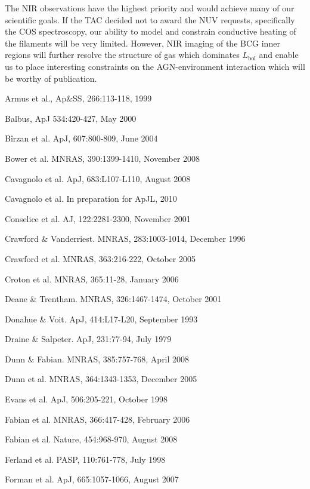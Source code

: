 \documentclass[11pt]{article}
\begin{document}
The NIR observations have the highest priority and would achieve many
of our scientific goals. If the TAC decided not to award the NUV
requests, specifically the COS spectroscopy, our ability to model and
constrain conductive heating of the filaments will be very
limited. However, NIR imaging of the BCG inner regions will further
resolve the structure of gas which dominates $L_{\mathrm{bol}}$ and
enable us to place interesting constraints on the AGN-environment
interaction which will be worthy of publication.


\noindent [1] Armus et al., Ap\&SS, 266:113-118, 1999

\noindent [2] Balbus, ApJ 534:420-427, May 2000

\noindent [3] B\^irzan et al. ApJ, 607:800-809, June 2004

\noindent [4] Bower et al. MNRAS, 390:1399-1410, November 2008

\noindent [5] Cavagnolo et al. ApJ, 683:L107-L110, August 2008

\noindent [6] Cavagnolo et al. In preparation for ApJL, 2010

\noindent [7] Conselice et al. AJ, 122:2281-2300, November 2001

\noindent [8] Crawford \& Vanderriest. MNRAS, 283:1003-1014, December 1996

\noindent [9] Crawford et al. MNRAS, 363:216-222, October 2005

\noindent [10] Croton et al. MNRAS, 365:11-28, January 2006

\noindent [11] Deane \& Trentham. MNRAS, 326:1467-1474, October 2001

\noindent [12] Donahue \& Voit. ApJ, 414:L17-L20, September 1993

\noindent [13] Draine \& Salpeter. ApJ, 231:77-94, July 1979

\noindent [14] Dunn \& Fabian. MNRAS, 385:757-768, April 2008

\noindent [15] Dunn et al. MNRAS, 364:1343-1353, December 2005

\noindent [16] Evans et al. ApJ, 506:205-221, October 1998

\noindent [17] Fabian et al. MNRAS, 366:417-428, February 2006

\noindent [18] Fabian et al. Nature, 454:968-970, August 2008

\noindent [19] Ferland et al. PASP, 110:761-778, July 1998

\noindent [20] Forman et al. ApJ, 665:1057-1066, August 2007
\end{document}
